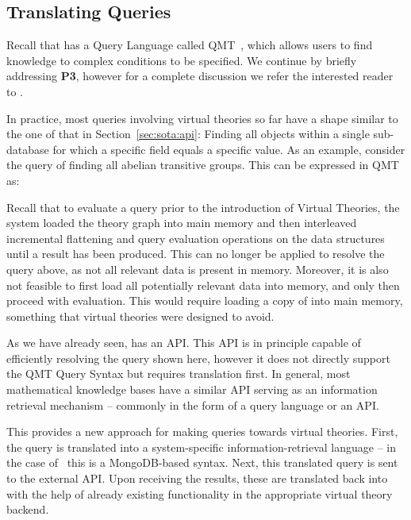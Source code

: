 \subsection{Translating Queries}

Recall that \mmt has a Query Language called QMT~\cite{Rabe:qlfml12}, which allows users to find knowledge to complex conditions to be specified. 
We continue by briefly addressing \textbf{P3}, however for a complete discussion we refer the interested reader to \cite{twiesing:msc17}. 

In practice, most queries involving virtual theories so far have a shape similar to the one of that in Section~\ref{sec:sota:api}: 
Finding all objects within a single sub-database for which a specific field equals a specific value. 
As an example, consider the query of finding all abelian transitive groups. 
This can be expressed in QMT as:

Recall that to evaluate a query prior to the introduction of Virtual Theories, the \mmt system loaded the theory graph into main memory and then interleaved incremental flattening and query evaluation operations on the \mmt data structures until a result has been produced. 
This can no longer be applied to resolve the query above, as not all relevant data is present in memory. 
Moreover, it is also not feasible to first load all potentially relevant data into memory, and only then proceed with evaluation. 
This would require loading a copy of \lmfdb into main memory, something that virtual
theories were designed to avoid. 

As we have already seen, \lmfdb has an API. 
This API is in principle capable of efficiently resolving the query shown here, however it does not directly support the QMT Query Syntax but requires translation first. 
In general, most mathematical knowledge bases have a similar API serving as an information retrieval mechanism -- commonly in the form of a query language or an API. 

This provides a new approach for making queries towards virtual theories. 
First, the \mmt query is translated into a system-specific information-retrieval language -- in the case of \lmfdb\ this is a MongoDB-based syntax.
Next, this translated query is sent to the external API. 
Upon receiving the results, these are translated back into \ommt with the help of already existing functionality in the appropriate virtual theory backend.

